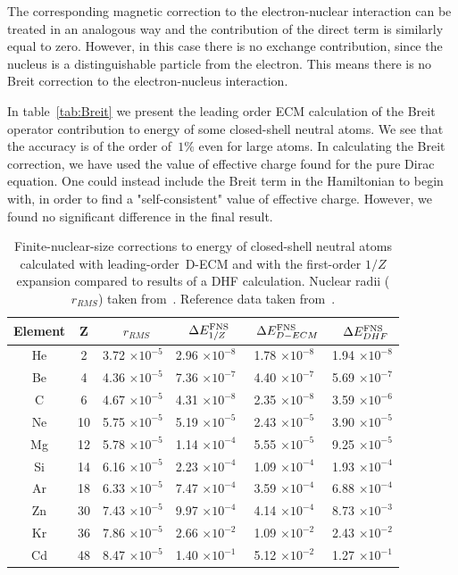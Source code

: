The corresponding magnetic correction to the electron-nuclear interaction can be treated in an analogous way and the contribution of the direct term is similarly equal to zero. However, in this case there is no exchange contribution, since the nucleus is a distinguishable particle from the electron. This means there is no Breit correction to the electron-nucleus interaction.

In table~\ref{tab:Breit} we present the leading order ECM calculation of the Breit operator contribution to energy of some closed-shell neutral atoms. We see that the accuracy is of the order of~$1\%$ even for large atoms. %
In calculating the Breit correction, we have used the value of effective charge found for the pure Dirac equation. One could instead include the Breit term in the Hamiltonian to begin with, in order to find a "self-consistent" value of effective charge. However, we found no significant difference in the final result.


\begin{table}[]
    \centering
    \begin{tabular}{ccc|ccc}
	Element & Z &~$r_{RMS}$ &~$\Delta E^{\rm{FNS}}_{1/Z}$ &~$\Delta E^{\rm{FNS}}_{D-ECM}$ & ~$\Delta E^{\rm{FNS}}_{DHF}$ \\
	\hline 
	\hline
	He & 2 & 3.72 $\times 10^{-5}$ & 2.96 $\times 10^{-8}$ & 1.78 $\times 10^{-8}$ & 1.94 $\times 10^{-8}$\\
	Be & 4 & 4.36 $\times 10^{-5}$ & 7.36 $\times 10^{-7}$ & 4.40 $\times 10^{-7}$ & 5.69 $\times 10^{-7}$\\
	C & 6 & 4.67 $\times 10^{-5}$ & 4.31 $\times 10^{-8}$ & 2.35 $\times 10^{-8}$  & 3.59 $\times 10^{-6}$\\
	Ne & 10 & 5.75 $\times 10^{-5}$ & 5.19 $\times 10^{-5}$ & 2.43 $\times 10^{-5}$ & 3.90 $\times 10^{-5}$\\
	Mg & 12 & 5.78 $\times 10^{-5}$ &  1.14 $\times 10^{-4}$ & 5.55 $\times 10^{-5}$  & 9.25 $\times 10^{-5}$\\
	Si & 14 & 6.16 $\times 10^{-5}$ &  2.23 $\times 10^{-4}$ & 1.09 $\times 10^{-4}$  & 1.93 $\times 10^{-4}$\\
	Ar & 18 & 6.33 $\times 10^{-5}$ & 7.47 $\times 10^{-4}$ & 3.59 $\times 10^{-4}$  & 6.88  $\times 10^{-4}$\\
	Zn & 30 & 7.43 $\times 10^{-5}$ & 9.97 $\times 10^{-4}$ & 4.14 $\times 10^{-4}$ & 8.73 $\times 10^{-3}$\\
	Kr & 36 & 7.86 $\times 10^{-5}$ & 2.66 $\times 10^{-2}$ & 1.09 $\times 10^{-2}$ & 2.43 $\times 10^{-2}$\\
	Cd & 48 & 8.47 $\times 10^{-5}$ & 1.40 $\times 10^{-1}$ & 5.12 $\times 10^{-2}$ & 1.27  $\times 10^{-1}$\\
	\hline
    \end{tabular}
	\caption{Finite-nuclear-size corrections to energy of closed-shell neutral atoms calculated with leading-order~D-ECM and with the first-order $1/Z$ expansion compared to results of a DHF calculation. Nuclear radii ($r_{RMS}$) taken from~\cite{ANGELI201369}. Reference data taken from~\cite{VISSCHER1997207}.}
	\label{tab:FNS}
\end{table}

